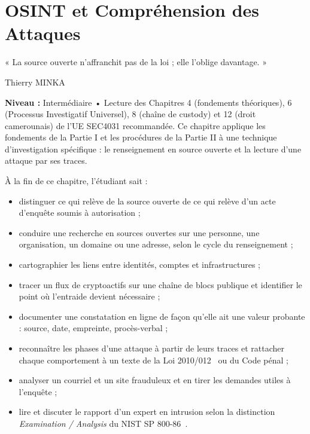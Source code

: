 \chapter{OSINT et Compréhension des Attaques}
\label{chap:for-osint}

\epigraph{%
    « La source ouverte n'affranchit pas de la loi ; elle l'oblige davantage. »%
}{Thierry MINKA}


\noindent\textbf{Niveau :} Intermédiaire • Lecture des Chapitres 4 (fondements théoriques), 6 (Processus Investigatif Universel), 8 (chaîne de custody) et 12 (droit camerounais) de l'UE SEC4031 recommandée. Ce chapitre applique les fondements de la Partie I et les procédures de la Partie II à une technique d'investigation spécifique : le renseignement en source ouverte et la lecture d'une attaque par ses traces.

\begin{boxobjectifs}
À la fin de ce chapitre, l'étudiant sait :
\begin{itemize}
\item distinguer ce qui relève de la source ouverte de ce qui relève d'un acte d'enquête soumis à autorisation ;
\item conduire une recherche en sources ouvertes sur une personne, une organisation, un domaine ou une adresse, selon le cycle du renseignement ;
\item cartographier les liens entre identités, comptes et infrastructures ;
\item tracer un flux de cryptoactifs sur une chaîne de blocs publique et identifier le point où l'entraide devient nécessaire ;
\item documenter une constatation en ligne de façon qu'elle ait une valeur probante : source, date, empreinte, procès-verbal ;
\item reconnaître les phases d'une attaque à partir de leurs traces et rattacher chaque comportement à un texte de la Loi 2010/012~\cite{cameroun2010a} ou du Code pénal ;
\item analyser un courriel et un site frauduleux et en tirer les demandes utiles à l'enquête ;
\item lire et discuter le rapport d'un expert en intrusion selon la distinction \emph{Examination / Analysis} du NIST SP 800-86~\cite{nist80086}.
\end{itemize}
\end{boxobjectifs}

